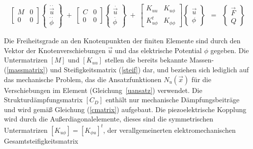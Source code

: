 \begin{small}
\begin{eqnarray}
\label{piezokopl}
 \left[
  \begin{array}{ll}
  M & 0 \\
  0 & 0
  \end{array}
 \right ]  \left \{
 \begin{array}{c}
   \stackrel{\cdot \cdot}{\vec u}  \\
   \stackrel{\cdot \cdot}{\phi}
  \end{array} \right \}           \; + \;
 \left[
 \begin{array}{ll}
  C & 0 \\
  0 & 0
 \end{array}
 \right ]
 \left \{
 \begin{array}{c}
  \stackrel{\cdot}{\vec u}  \\
  \stackrel{\cdot}{\phi}
 \end{array} \right \}
                       \; + \;
 \left[
 \begin{array}{ll}
  K_{uu}           & K_{u \phi} \\
  K_{u \phi}^{t}   & K_{\phi \phi}
 \end{array}
 \right ]
 \left \{
 \begin{array}{c}
  \vec u \\
  \phi
 \end{array} \right \}
                        & = &
\left \{
\begin{array}{c}
\vec F \\
Q
\end{array} \right \}
\end{eqnarray}
\end{small}
Die Freiheitsgrade an den Knotenpunkten der finiten Elemente sind
durch den Vektor der Knotenverschiebungen $\vec u$ und das elektrische
Potential $\phi$ gegeben. Die Untermatrizen $[M]$ und $[K_{uu}]$ stellen
die bereits bekannte Massen- (\ref{massmatrix}) und Steifigkeitsmatrix
(\ref{steif}) dar, und beziehen sich lediglich auf das mechanische Problem,
das die Ansatzfunktionen $N_{u}(\vec x)$ für die Verschiebungen im Element
(Gleichung~\ref{uansatz}) verwendet. Die Strukturdämpfungsmatrix $[C_{D}]$
enthält nur mechanische Dämpfungsbeiträge
und wird gemäß Gleichung (\ref{cmatrix}) aufgebaut. Die piezoelektrische
Kopplung wird durch die Außerdiagonalelemente, dieses sind
die symmetrischen Untermatrizen $[K_{u\phi}] = [K_{\phi u}]^{t}$, der
verallgemeinerten elektromechanischen Gesamtsteifigkeitsmatrix
